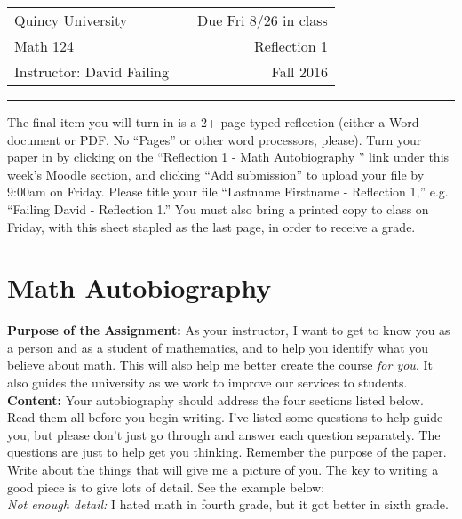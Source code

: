 \documentclass{article}
\begin{document}
\begin{tabular}{lcr}
Quincy University & \hspace{3in} & Due Fri 8/26 in class\\
Math 124 & \hspace{3in} & Reflection 1\\
Instructor: David Failing & \hspace{3in} & Fall 2016
\end{tabular}

\hrule

\vspace{\baselineskip}

The final item you will turn in is a 2+ page typed reflection (either a Word document or PDF. No ``Pages'' or other word processors, please). Turn your paper in by clicking on the ``Reflection 1 - Math Autobiography '' link under this week's Moodle section, and clicking ``Add submission'' to upload your file by 9:00am on Friday. Please title your file ``Lastname Firstname - Reflection 1,'' e.g. ``Failing David - Reflection 1.'' You must also bring a printed copy to class on Friday, with this sheet stapled as the last page, in order to receive a grade.

\section*{Math Autobiography}

\noindent\textbf{Purpose of the Assignment:} As your instructor, I want to get to know you as a person and as a student of mathematics, and to help you identify what you believe about math.  This will also help me better create the course \textit{for you}.  It also guides the university as we work to improve our services to students.\\

\noindent\textbf{Content:} Your autobiography should address the four sections listed below.  Read them all before you begin writing. I've listed some questions to help guide you, but please don't just go through and answer each question separately.  The questions are just to help get you thinking.  Remember the purpose of the paper.  Write about the things that will give me a picture of you.  The key to writing a good piece is to give lots of detail.  See the example below:\\

\noindent\textit{Not enough detail:} I hated math in fourth grade, but it got better in sixth grade.\\
\end{document}
